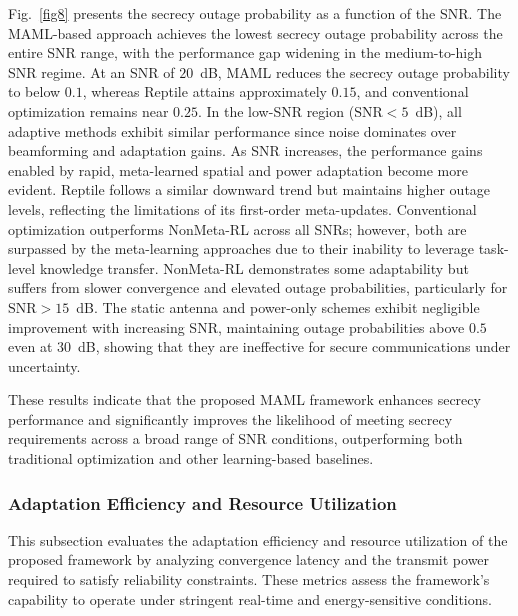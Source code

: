 \documentclass[journal,10pt]{IEEEtran}
\begin{document}
Fig.~\ref{fig8} presents the secrecy outage probability as a function of the SNR. The MAML-based approach  achieves the lowest secrecy outage probability across the entire SNR range, with the performance gap widening in the medium-to-high SNR regime. At an SNR of $20$~dB, MAML reduces the secrecy outage probability to below $0.1$, whereas Reptile attains approximately $0.15$, and conventional optimization remains near $0.25$. In the low-SNR region ($\mathrm{SNR} < 5$~\textnormal{dB}), all adaptive methods exhibit similar performance since noise dominates over beamforming and adaptation gains. 
As SNR increases, the performance gains enabled by rapid, meta-learned spatial and power adaptation become more evident.
Reptile follows a similar downward trend but maintains higher outage levels, reflecting the limitations of its first-order meta-updates. Conventional optimization outperforms NonMeta-RL across all SNRs; however, both are surpassed by the meta-learning approaches due to their inability to leverage task-level knowledge transfer. NonMeta-RL demonstrates some adaptability but suffers from slower convergence and elevated outage probabilities, particularly for $\mathrm{SNR} > 15$~dB. The static antenna and power-only schemes exhibit negligible improvement with increasing SNR, maintaining outage probabilities above $0.5$ even at $30$~dB,  showing that they are ineffective for secure communications under uncertainty.

These results indicate that the proposed MAML framework  enhances secrecy performance and significantly improves the likelihood of meeting secrecy requirements across a broad range of SNR conditions, outperforming both traditional optimization and other learning-based baselines.


\subsubsection{Adaptation Efficiency and Resource Utilization} 
This subsection evaluates the adaptation efficiency and resource utilization of the proposed framework by analyzing convergence latency and the transmit power required to satisfy reliability constraints. These metrics assess the framework’s capability to operate under stringent real-time and energy-sensitive conditions.
\end{document}
